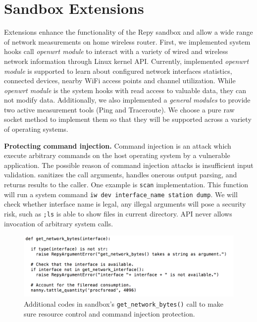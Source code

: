 \section{Sandbox Extensions}
\label{sec.extensions}
Extensions enhance the functionality of the Repy sandbox and allow a wide range of network measurements on home wireless router. First, we implemented system hooks call \textit{openwrt module} to interact with a variety of wired and wireless network information through Linux kernel API. Currently, implemented \textit{openwrt module} is supported to learn about configured network interfaces statistics, connected devices, nearby WiFi access points and channel utilization. While \textit{openwrt module} is the system hooks with read access to valuable data, they can not modify data. Additionally, we also implemented a \textit{general modules} to provide two active measurement tools (Ping and Traceroute). We choose a pure raw socket method to implement them so that they will be supported across a variety of operating systems. 

\textbf{Protecting command injection.} Command injection is an attack which execute arbitrary commands on the host operating system by a vulnerable application. The possible reason of command injection attacks is insufficient input validation. \sysname sanitizes the call arguments, handles onerous output parsing, and returns results to the caller. One example is \texttt{scan} implementation. This function will run a system command \texttt{iw dev interface\_name station dump}. We will check whether interface name is legal, any illegal arguments will pose a security risk, such as \texttt{;ls} is able to show files in current directory. \sysname API never allows invocation of arbitrary system calls.

\begin{figure}%
\centering
\includegraphics[width=0.8\columnwidth]{figure/nanny.png}
\caption{Additional codes in \sysname sandbox's \texttt{get\_network\_bytes()} call to make sure resource control and command injection protection.}
\label{fig-nanny}
\end{figure}

